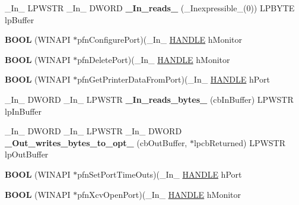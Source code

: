 \begin{DoxyCompactItemize}
\+\_\+\+In\+\_\+ L\+P\+W\+S\+TR \+\_\+\+In\+\_\+ D\+W\+O\+RD {\bfseries \+\_\+\+In\+\_\+reads\+\_\+} (\+\_\+\+Inexpressible\+\_\+(0)) L\+P\+B\+Y\+TE lp\+Buffer
\item 
\mbox{\label{struct___m_o_n_i_t_o_r2_a4dbcdd587ea0d27dbbafa0b7ce49a925}} 
{\bfseries B\+O\+OL} (W\+I\+N\+A\+PI $\ast$pfn\+Configure\+Port)(\+\_\+\+In\+\_\+ \hyperlink{interfacevoid}{H\+A\+N\+D\+LE} h\+Monitor
\item 
\mbox{\label{struct___m_o_n_i_t_o_r2_a07a5499d4dccf7b0ae08aac89e514d02}} 
{\bfseries B\+O\+OL} (W\+I\+N\+A\+PI $\ast$pfn\+Delete\+Port)(\+\_\+\+In\+\_\+ \hyperlink{interfacevoid}{H\+A\+N\+D\+LE} h\+Monitor
\item 
\mbox{\label{struct___m_o_n_i_t_o_r2_a2033278a5ab2ec2dce77f5eb173f7589}} 
{\bfseries B\+O\+OL} (W\+I\+N\+A\+PI $\ast$pfn\+Get\+Printer\+Data\+From\+Port)(\+\_\+\+In\+\_\+ \hyperlink{interfacevoid}{H\+A\+N\+D\+LE} h\+Port
\item 
\mbox{\label{struct___m_o_n_i_t_o_r2_a0922c548a74f01092ac9028e9f1bf300}} 
\+\_\+\+In\+\_\+ D\+W\+O\+RD \+\_\+\+In\+\_\+ L\+P\+W\+S\+TR {\bfseries \+\_\+\+In\+\_\+reads\+\_\+bytes\+\_\+} (cb\+In\+Buffer) L\+P\+W\+S\+TR lp\+In\+Buffer
\item 
\mbox{\label{struct___m_o_n_i_t_o_r2_a0d3893d2951a0a4bbc582337f894e82c}} 
\+\_\+\+In\+\_\+ D\+W\+O\+RD \+\_\+\+In\+\_\+ L\+P\+W\+S\+TR \+\_\+\+In\+\_\+ D\+W\+O\+RD {\bfseries \+\_\+\+Out\+\_\+writes\+\_\+bytes\+\_\+to\+\_\+opt\+\_\+} (cb\+Out\+Buffer, $\ast$lpcb\+Returned) L\+P\+W\+S\+TR lp\+Out\+Buffer
\item 
\mbox{\label{struct___m_o_n_i_t_o_r2_a058bfc41a09e2e4e76d7de9735e5b67a}} 
{\bfseries B\+O\+OL} (W\+I\+N\+A\+PI $\ast$pfn\+Set\+Port\+Time\+Outs)(\+\_\+\+In\+\_\+ \hyperlink{interfacevoid}{H\+A\+N\+D\+LE} h\+Port
\item 
\mbox{\label{struct___m_o_n_i_t_o_r2_aae78ebdc1adf803cd9c6abcd2cface3e}} 
{\bfseries B\+O\+OL} (W\+I\+N\+A\+PI $\ast$pfn\+Xcv\+Open\+Port)(\+\_\+\+In\+\_\+ \hyperlink{interfacevoid}{H\+A\+N\+D\+LE} h\+Monitor
\item 

\end{DoxyCompactItemize}
